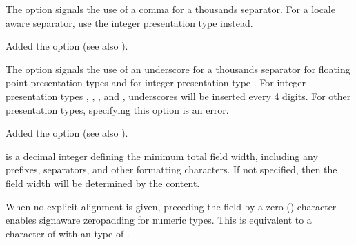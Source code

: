 \documentclass[letterpaper,10pt,english]{sphinxmanual}
\begin{document}
\ignorespaces
The \sphinxcode{\sphinxupquote{\textquotesingle{},\textquotesingle{}}} option signals the use of a comma for a thousands separator.
For a locale aware separator, use the  integer presentation type
instead.

Added the \sphinxcode{\sphinxupquote{\textquotesingle{},\textquotesingle{}}} option (see also ).

\ignorespaces
The \sphinxcode{\sphinxupquote{\textquotesingle{}\_\textquotesingle{}}} option signals the use of an underscore for a thousands
separator for floating point presentation types and for integer
presentation type .  For integer presentation types ,
, , and , underscores will be inserted every 4
digits.  For other presentation types, specifying this option is an
error.

Added the \sphinxcode{\sphinxupquote{\textquotesingle{}\_\textquotesingle{}}} option (see also ).

 is a decimal integer defining the minimum total field width,
including any prefixes, separators, and other formatting characters.
If not specified, then the field width will be determined by the content.

When no explicit alignment is given, preceding the  field by a zero
(\sphinxcode{\sphinxupquote{\textquotesingle{}0\textquotesingle{}}}) character enables
sign\sphinxhyphen{}aware zero\sphinxhyphen{}padding for numeric types.  This is equivalent to a 
character of \sphinxcode{\sphinxupquote{\textquotesingle{}0\textquotesingle{}}} with an  type of \sphinxcode{\sphinxupquote{\textquotesingle{}=\textquotesingle{}}}.
\end{document}
